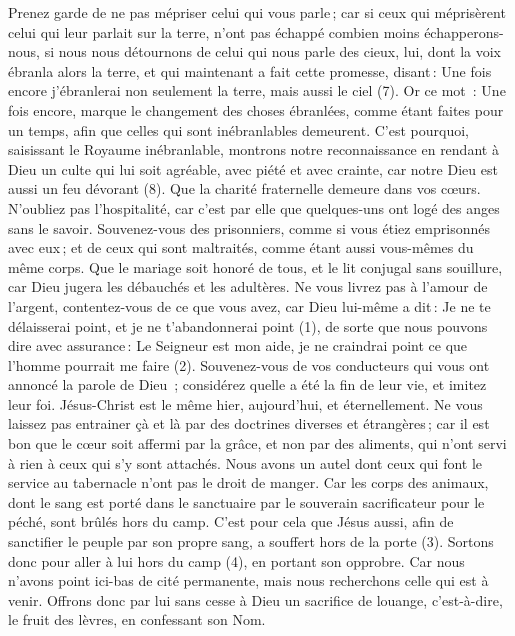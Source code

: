 \begin{multicols}{2}
Prenez garde de ne pas mépriser celui qui vous parle ; car si ceux qui méprisèrent celui qui leur parlait sur la terre, n’ont pas échappé combien moins échapperons-nous, si nous nous détournons de celui qui nous parle des cieux,
lui, dont la voix ébranla alors la terre, et qui maintenant a fait cette promesse, disant : Une fois encore j'ébranlerai non seulement la terre, mais aussi le ciel (7).
Or ce mot : Une fois encore, marque le changement des choses ébranlées, comme étant faites pour un temps, afin que celles qui sont inébranlables demeurent.
C'est pourquoi, saisissant le Royaume inébranlable, montrons notre reconnaissance en rendant à Dieu un culte qui lui soit agréable, avec piété et avec crainte,
car notre Dieu est aussi un feu dévorant (8).
\VerseOne{}Que la charité fraternelle demeure dans vos cœurs.
N'oubliez pas l'hospitalité, car c’est par elle que quelques-uns ont logé des anges sans le savoir.
Souvenez-vous des prisonniers, comme si vous étiez emprisonnés avec eux ; et de ceux qui sont maltraités, comme étant aussi vous-mêmes du même corps.
Que le mariage soit honoré de tous, et le lit conjugal sans souillure, car Dieu jugera les débauchés et les adultères.
Ne vous livrez pas à l’amour de l’argent, contentez-vous de ce que vous avez, car Dieu lui-même a dit : Je ne te délaisserai point, et je ne t'abandonnerai point (1),
de sorte que nous pouvons dire avec assurance : Le Seigneur est mon aide, je ne craindrai point ce que l'homme pourrait me faire (2).
Souvenez-vous de vos conducteurs qui vous ont annoncé la parole de Dieu ; considérez quelle a été la fin de leur vie, et imitez leur foi.
Jésus-Christ est le même hier, aujourd'hui, et éternellement.
Ne vous laissez pas entrainer çà et là par des doctrines diverses et étrangères ; car il est bon que le cœur soit affermi par la grâce, et non par des aliments, qui n'ont servi à rien à ceux qui s'y sont attachés.
Nous avons un autel dont ceux qui font le service au tabernacle n'ont pas le droit de manger.
Car les corps des animaux, dont le sang est porté dans le sanctuaire par le souverain sacrificateur pour le péché, sont brûlés hors du camp.
C'est pour cela que Jésus aussi, afin de sanctifier le peuple par son propre sang, a souffert hors de la porte (3).
Sortons donc pour aller à lui hors du camp (4), en portant son opprobre.
Car nous n'avons point ici-bas de cité permanente, mais nous recherchons celle qui est à venir.
Offrons donc par lui sans cesse à Dieu un sacrifice de louange, c'est-à-dire, le fruit des lèvres, en confessant son Nom.

\end{multicols}
